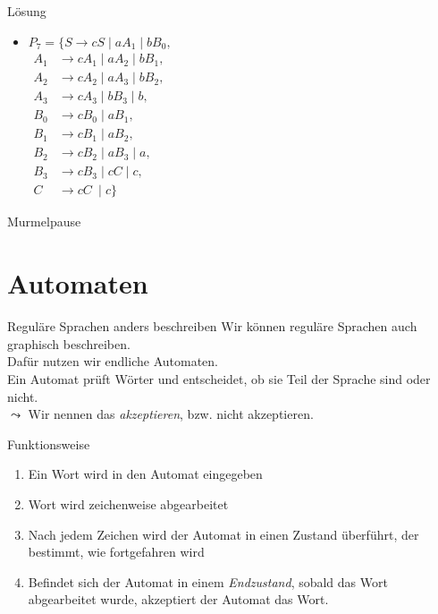 \documentclass[10pt]{beamer}
\begin{document}
{
\begin{frame}{Lösung}
        \begin{itemize}
            \item 
                \alert<1>{
                $P_7 = \{S \to cS \mid aA_1 \mid bB_0,$\\
                \vspace*{0.9mm}
                \hspace*{7mm}
                $\begin{aligned}
                A_1 &\to cA_1 \mid aA_2 \mid bB_1,\\
                A_2 &\to cA_2 \mid aA_3 \mid bB_2,\\
                A_3 &\to cA_3 \mid bB_3 \mid b,\\
                B_0 &\to cB_0 \mid aB_1,\\
                B_1 &\to cB_1 \mid aB_2,\\
                B_2 &\to cB_2 \mid aB_3 \mid a,\\
                B_3 &\to cB_3 \mid cC \mid c,\\
                C_{\;} &\to cC_{\;}\mid c\}
                \end{aligned}
                $}
        \end{itemize}
\end{frame}
}

\begin{frame}[standout]
  Murmelpause
\end{frame}

\section{Automaten}

\begin{frame}[fragile]{Reguläre Sprachen anders beschreiben}
    Wir können reguläre Sprachen auch graphisch beschreiben.\\
    Dafür nutzen wir \alert{endliche Automaten}.\\
    Ein Automat prüft Wörter und entscheidet, ob sie Teil der Sprache sind oder nicht.\\
    $\leadsto$ Wir nennen das \alert{\emph{akzeptieren}}, bzw. nicht akzeptieren.
    \begin{alertblock}{Funktionsweise}
    \begin{enumerate}
        \item Ein Wort wird in den Automat eingegeben
        \item Wort wird zeichenweise abgearbeitet
        \item Nach jedem Zeichen wird der Automat in einen Zustand überführt, der bestimmt, wie fortgefahren wird
        \item Befindet sich der Automat in einem \emph{Endzustand}, sobald das Wort abgearbeitet wurde, akzeptiert der Automat das Wort.
    \end{enumerate}
    \end{alertblock}
\end{frame}
\end{document}
